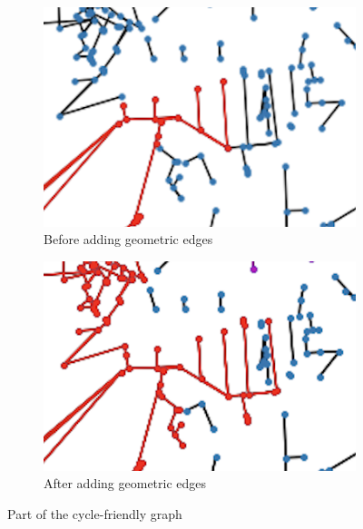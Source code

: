 \documentclass[12pt,a4paper]{report}
\begin{document}
\begin{figure}[ht]
    \centering
    \begin{subfigure}[ht]{0.35\textwidth}
        \centering
        \includegraphics[width=\textwidth]{plan_images/close_before.png}
        \caption{Before adding geometric edges}
        \label{fig:close before}
    \end{subfigure}
    \hfill
    \begin{subfigure}[ht]{0.35\textwidth}
        \centering
        \includegraphics[width=\textwidth]{plan_images/close_after.png}
        \caption{After adding geometric edges}
        \label{fig:close after}
    \end{subfigure}
       \caption{Part of the cycle-friendly graph}
       \label{fig:close example}
\end{figure}
\end{document}
